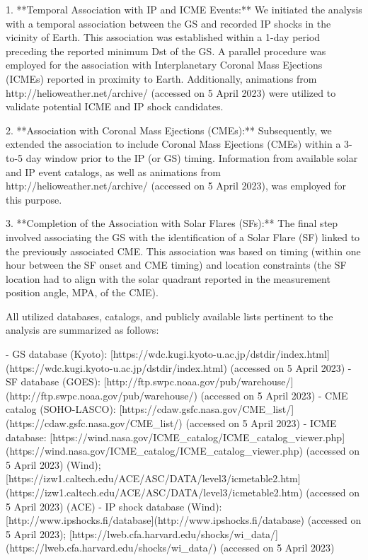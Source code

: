 1. **Temporal Association with IP and ICME Events:**
We initiated the analysis with a temporal association between the GS and recorded IP shocks in the vicinity of Earth. This association was established within a 1-day period preceding the reported minimum Dst of the GS. A parallel procedure was employed for the association with Interplanetary Coronal Mass Ejections (ICMEs) reported in proximity to Earth. Additionally, animations from http://helioweather.net/archive/ (accessed on 5 April 2023) were utilized to validate potential ICME and IP shock candidates.

2. **Association with Coronal Mass Ejections (CMEs):**
Subsequently, we extended the association to include Coronal Mass Ejections (CMEs) within a 3-to-5 day window prior to the IP (or GS) timing. Information from available solar and IP event catalogs, as well as animations from http://helioweather.net/archive/ (accessed on 5 April 2023), was employed for this purpose.

3. **Completion of the Association with Solar Flares (SFs):**
The final step involved associating the GS with the identification of a Solar Flare (SF) linked to the previously associated CME. This association was based on timing (within one hour between the SF onset and CME timing) and location constraints (the SF location had to align with the solar quadrant reported in the measurement position angle, MPA, of the CME).

All utilized databases, catalogs, and publicly available lists pertinent to the analysis are summarized as follows:

- GS database (Kyoto): [https://wdc.kugi.kyoto-u.ac.jp/dstdir/index.html](https://wdc.kugi.kyoto-u.ac.jp/dstdir/index.html) (accessed on 5 April 2023)
- SF database (GOES): [http://ftp.swpc.noaa.gov/pub/warehouse/](http://ftp.swpc.noaa.gov/pub/warehouse/) (accessed on 5 April 2023)
- CME catalog (SOHO-LASCO): [https://cdaw.gsfc.nasa.gov/CME_list/](https://cdaw.gsfc.nasa.gov/CME_list/) (accessed on 5 April 2023)
- ICME database: [https://wind.nasa.gov/ICME_catalog/ICME_catalog_viewer.php](https://wind.nasa.gov/ICME_catalog/ICME_catalog_viewer.php) (accessed on 5 April 2023) (Wind); [https://izw1.caltech.edu/ACE/ASC/DATA/level3/icmetable2.htm](https://izw1.caltech.edu/ACE/ASC/DATA/level3/icmetable2.htm) (accessed on 5 April 2023) (ACE)
- IP shock database (Wind): [http://www.ipshocks.fi/database](http://www.ipshocks.fi/database) (accessed on 5 April 2023); [https://lweb.cfa.harvard.edu/shocks/wi_data/](https://lweb.cfa.harvard.edu/shocks/wi_data/) (accessed on 5 April 2023)

